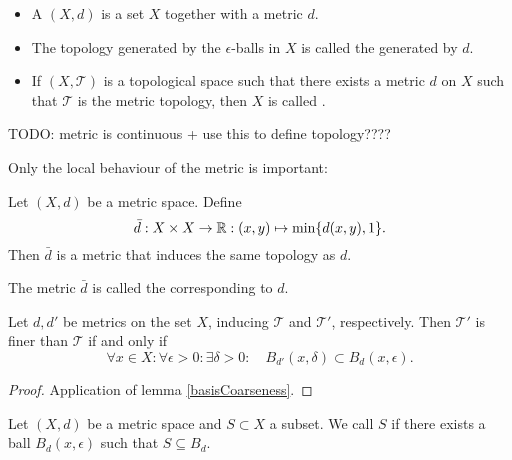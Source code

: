 \begin{definition}
\begin{itemize}
\item A  $(X,d)$ is a set $X$ together with a metric $d$.
\item The topology generated by the $\epsilon$-balls in $X$ is called the  generated by $d$.
\item If $(X,\mathcal{T})$ is a topological space such that there exists a metric $d$ on $X$ such that $\mathcal{T}$ is the metric topology, then $X$ is called .
\end{itemize}
\end{definition}

TODO: metric is continuous + use this to define topology????


Only the local behaviour of the metric is important:
\begin{proposition}
Let $(X,d)$ be a metric space. Define
\[ \bar{d}:X\times X\to \mathbb{R}: (x,y)\mapsto \min\{d(x,y),1\}. \]
Then $\bar{d}$ is a metric that induces the same topology as $d$.
\end{proposition}
The metric $\bar{d}$ is called the  corresponding to $d$.

\begin{proposition} \label{ballsCoarseness}
Let $d,d'$ be metrics on the set $X$, inducing $\mathcal{T}$ and $\mathcal{T}'$, respectively. Then $\mathcal{T}'$ is finer than $\mathcal{T}$ \textup{if and only if}
\[ \forall x\in X:\forall \epsilon>0:\exists \delta>0:\quad B_{d'}(x,\delta)\subset B_d(x,\epsilon). \]
\end{proposition}
\begin{proof}
Application of lemma \ref{basisCoarseness}.
\end{proof}

\begin{definition}
Let $(X,d)$ be a metric space and $S\subset X$ a subset. We call $S$  if there exists a ball $B_d(x,\epsilon)$ such that $S\subseteq B_d$.
\end{definition}

